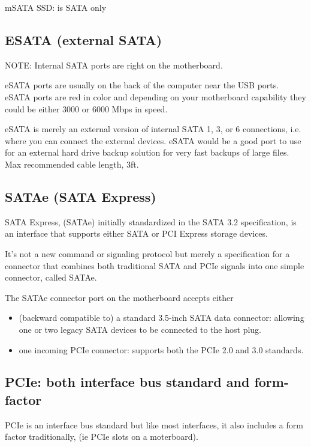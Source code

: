 mSATA SSD:  is SATA only
 
\subsection{ESATA (external SATA)}

NOTE: Internal SATA ports are right on the motherboard.

eSATA ports are usually on the back of the computer near the USB ports. eSATA
ports are red in color and depending on your motherboard capability they could
be either 3000 or 6000 Mbps in speed.

eSATA is merely an external version of internal SATA 1, 3, or 6 connections,
i.e. where you can connect the external devices.
 eSATA would be a good port to use for an external hard drive backup solution
for very fast backups of large files. Max recommended cable length, 3ft.


\subsection{SATAe (SATA Express)}
\label{sec:SATAe}

SATA Express, (SATAe) initially standardized in the SATA 3.2 specification, is
an interface that supports either SATA or PCI Express storage devices.

It's not a new command or signaling protocol but merely a specification for a
connector that combines both traditional SATA and PCIe signals into one simple
connector, called SATAe.

The SATAe connector port on the motherboard accepts either
\begin{itemize}
  \item  (backward compatible to) a standard 3.5-inch SATA data connector: 
  allowing one or two legacy SATA devices to be connected to the host plug.
  
  \item one incoming PCIe connector: supports both the PCIe 2.0 and 3.0
  standards.
\end{itemize}





\subsection{PCIe: both interface bus standard and form-factor}
\label{sec:PCIe}


PCIe is an interface bus standard but like most interfaces, it also includes a
form factor traditionally, (ie PCIe slots on a moterboard).


